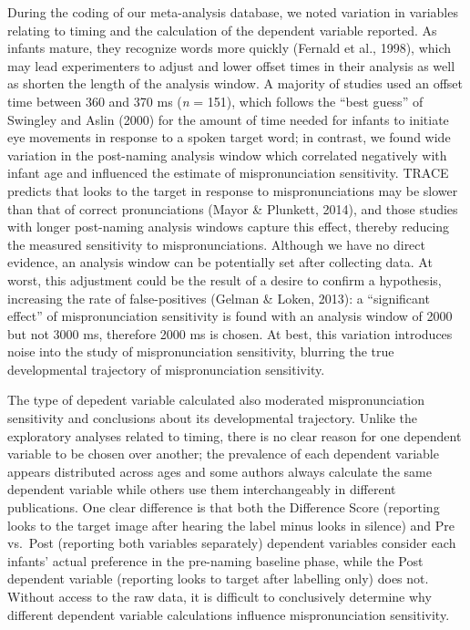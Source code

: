 \documentclass[man, noextraspace]{apa6}
\begin{document}
During the coding of our meta-analysis database, we noted variation in variables relating to timing and the calculation of the dependent variable reported. As infants mature, they recognize words more quickly (Fernald et al., 1998), which may lead experimenters to adjust and lower offset times in their analysis as well as shorten the length of the analysis window. A majority of studies used an offset time between 360 and 370 ms (\emph{n} = 151), which follows the \enquote{best guess} of Swingley and Aslin (2000) for the amount of time needed for infants to initiate eye movements in response to a spoken target word; in contrast, we found wide variation in the post-naming analysis window which correlated negatively with infant age and influenced the estimate of mispronunciation sensitivity. TRACE predicts that looks to the target in response to mispronunciations may be slower than that of correct pronunciations (Mayor \& Plunkett, 2014), and those studies with longer post-naming analysis windows capture this effect, thereby reducing the measured sensitivity to mispronunciations. Although we have no direct evidence, an analysis window can be potentially set after collecting data. At worst, this adjustment could be the result of a desire to confirm a hypothesis, increasing the rate of false-positives (Gelman \& Loken, 2013): a \enquote{significant effect} of mispronunciation sensitivity is found with an analysis window of 2000 but not 3000 ms, therefore 2000 ms is chosen. At best, this variation introduces noise into the study of mispronunciation sensitivity, blurring the true developmental trajectory of mispronunciation sensitivity.

The type of depedent variable calculated also moderated mispronunciation sensitivity and conclusions about its developmental trajectory. Unlike the exploratory analyses related to timing, there is no clear reason for one dependent variable to be chosen over another; the prevalence of each dependent variable appears distributed across ages and some authors always calculate the same dependent variable while others use them interchangeably in different publications. One clear difference is that both the Difference Score (reporting looks to the target image after hearing the label minus looks in silence) and Pre vs.~Post (reporting both variables separately) dependent variables consider each infants' actual preference in the pre-naming baseline phase, while the Post dependent variable (reporting looks to target after labelling only) does not. Without access to the raw data, it is difficult to conclusively determine why different dependent variable calculations influence mispronunciation sensitivity.
\end{document}
